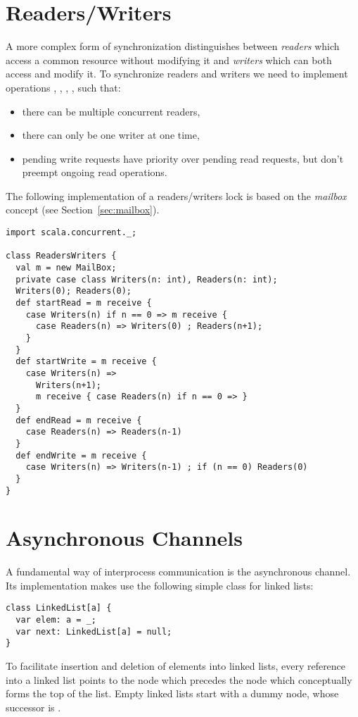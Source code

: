 \documentclass[a4paper,12pt,twoside,titlepage]{book}
\begin{document}
{\section{Readers/Writers}

A more complex form of synchronization distinguishes between {\em
readers} which access a common resource without modifying it and {\em
writers} which can both access and modify it. To synchronize readers
and writers we need to implement operations , ,
, , such that:
\begin{itemize}
\item there can be multiple concurrent readers,
\item there can only be one writer at one time,
\item pending write requests have priority over pending read requests,
but don't preempt ongoing read operations.
\end{itemize}
The following implementation of a readers/writers lock is based on the
{\em mailbox} concept (see Section~\ref{sec:mailbox}).

\begin{lstlisting}
import scala.concurrent._;

class ReadersWriters {
  val m = new MailBox;
  private case class Writers(n: int), Readers(n: int);
  Writers(0); Readers(0);
  def startRead = m receive {
    case Writers(n) if n == 0 => m receive {
      case Readers(n) => Writers(0) ; Readers(n+1);
    }
  }
  def startWrite = m receive {
    case Writers(n) =>
      Writers(n+1);
      m receive { case Readers(n) if n == 0 => }
  }
  def endRead = m receive {
    case Readers(n) => Readers(n-1)
  }
  def endWrite = m receive {
    case Writers(n) => Writers(n-1) ; if (n == 0) Readers(0)
  }
}
\end{lstlisting}

\section{Asynchronous Channels}

A fundamental way of interprocess communication is the asynchronous
channel. Its implementation makes use the following simple class for linked
lists:
\begin{lstlisting}
class LinkedList[a] {
  var elem: a = _;
  var next: LinkedList[a] = null;
}
\end{lstlisting}
To facilitate insertion and deletion of elements into linked lists,
every reference into a linked list points to the node which precedes
the node which conceptually forms the top of the list.
Empty linked lists start with a dummy node, whose successor is .

}
\end{document}
